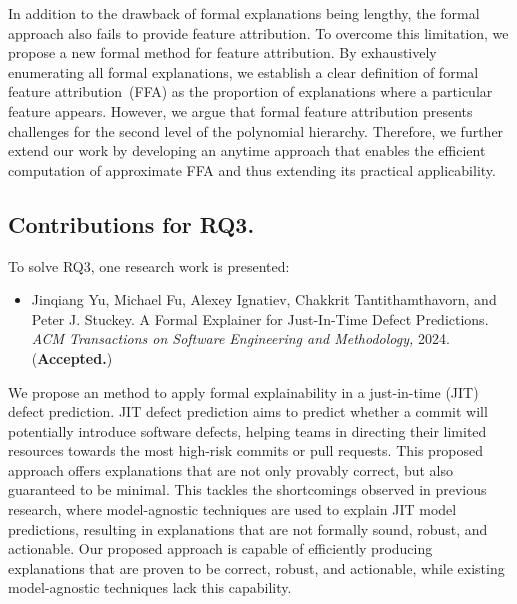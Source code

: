 In addition to the drawback of formal explanations being lengthy,
the formal approach also fails to provide feature attribution.
%
To overcome this limitation, we propose a new formal method for feature attribution.
%
By exhaustively enumerating all formal explanations, we establish a clear definition
of formal feature attribution~(FFA) as the proportion of explanations
where a particular feature appears.
%
However, we argue that formal feature attribution presents challenges for
the second level of the polynomial hierarchy.
%
Therefore, we further extend our work by developing an anytime approach 
that enables the efficient computation of approximate FFA 
and thus extending its practical applicability.

\subsection{Contributions for RQ3.}

To solve RQ3,  one research work is presented:
\begin{itemize}
	\item Jinqiang Yu, Michael Fu, Alexey Ignatiev, Chakkrit Tantithamthavorn, and Peter J. Stuckey. A
Formal Explainer for Just-In-Time Defect Predictions. \emph{ACM Transactions on Software Engineering
	and Methodology,} 2024. (\textbf{Accepted.}) 
\end{itemize}


We propose an method to apply formal explainability in a just-in-time (JIT) defect prediction.
%
JIT defect prediction aims to predict whether a commit will potentially introduce
software defects, helping teams in directing their limited resources towards the
most high-risk commits or pull requests.
%
This proposed approach offers explanations that are not only provably correct,
but also guaranteed to be minimal.
%
This tackles the shortcomings observed in previous research, where model-agnostic techniques are
used to explain JIT model predictions, resulting in explanations
that are not formally sound, robust, and actionable.
%
Our proposed approach is capable of efficiently producing explanations that 
are proven to be correct, robust, and actionable, while existing model-agnostic techniques
lack this capability.
